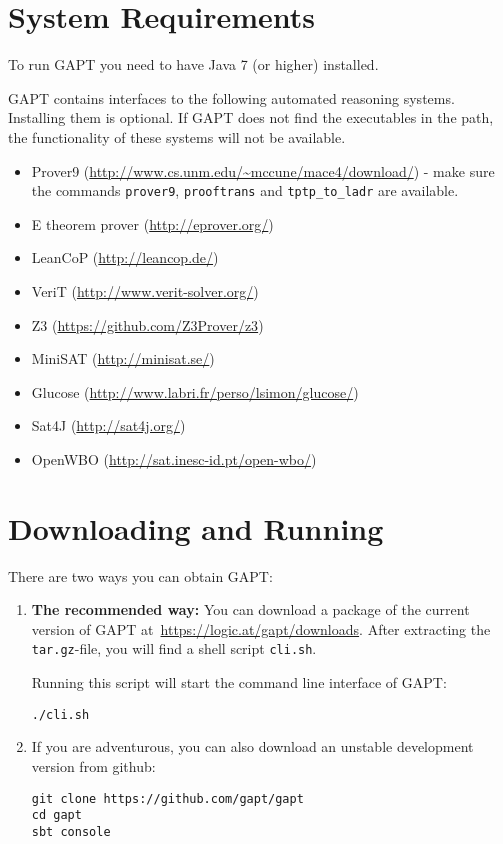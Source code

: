\documentclass[a4paper,11pt]{article}
\begin{document}
\section{System Requirements}
\label{sec:sysreq}

To run GAPT you need to have Java 7 (or higher) installed.

GAPT contains interfaces to the following automated reasoning systems. Installing
them is optional. If GAPT does not find the executables in the path, the
functionality of these systems will not be available. 
%
\begin{itemize}
\item Prover9 (\url{http://www.cs.unm.edu/~mccune/mace4/download/}) - make sure
the commands \texttt{prover9}, \texttt{prooftrans} and \texttt{tptp\_to\_ladr}
are available.
\item E theorem prover (\url{http://eprover.org/})
\item LeanCoP (\url{http://leancop.de/})
\item VeriT (\url{http://www.verit-solver.org/})
\item Z3 (\url{https://github.com/Z3Prover/z3})
\item MiniSAT (\url{http://minisat.se/})
\item Glucose (\url{http://www.labri.fr/perso/lsimon/glucose/})
\item Sat4J (\url{http://sat4j.org/})
\item OpenWBO (\url{http://sat.inesc-id.pt/open-wbo/})
\end{itemize}

\section{Downloading and Running}

There are two ways you can obtain GAPT:

\begin{enumerate}

\item {\bfseries The recommended way:}  You can download a package of the current
version of GAPT at~\url{https://logic.at/gapt/downloads}.  After extracting
the \texttt{tar.gz}-file, you will find a shell script \texttt{cli.sh}.

Running this script will start the command line interface of GAPT:
\begin{lstlisting}
./cli.sh
\end{lstlisting}

\item If you are adventurous, you can also download an unstable development
  version from github:
\begin{lstlisting}
git clone https://github.com/gapt/gapt
cd gapt
sbt console
\end{lstlisting}

\end{enumerate}
\end{document}

